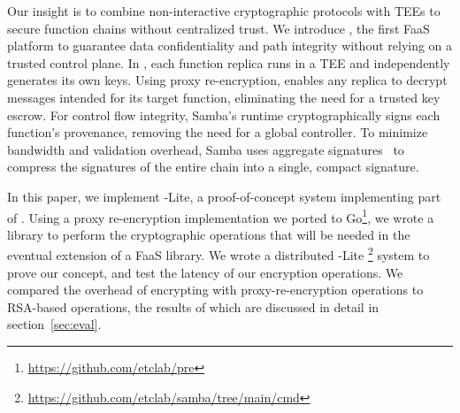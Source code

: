 %
Our insight is to combine non-interactive cryptographic protocols with
TEEs to secure function chains without centralized trust.
%
We introduce \SystemName, the first FaaS platform to guarantee data
confidentiality and path integrity without relying on a trusted control plane.
%
In \SystemName,  each function replica runs in a TEE and independently generates its own keys.
%
Using proxy re-encryption,  \SystemName enables any replica to decrypt
messages intended for its target function, eliminating the need for a trusted
key escrow.
%
For control flow integrity, Samba's runtime cryptographically signs each
function's provenance, removing the need for a global controller.
%
To minimize bandwidth and validation overhead, Samba uses aggregate
signatures~\cite{03-eurocrypt-aggregate_signatures_bilinear_maps} to compress
the signatures of the entire chain into a single, compact signature.


In this paper, we implement \SystemName-Lite, a proof-of-concept system implementing part  of \SystemName.
%
Using a proxy re-encryption implementation we ported to Go\footnote{\url{https://github.com/etclab/pre}}, we wrote a  library to perform the cryptographic operations that will be needed in the eventual \SystemName extension of a FaaS library.
%
We wrote a distributed \SystemName-Lite \footnote{\url{https://github.com/etclab/samba/tree/main/cmd}} system to prove our concept, and test the latency of our encryption operations.
%
We compared the overhead of encrypting with \SystemName proxy-re-encryption operations to RSA-based operations, the results of which are discussed in detail in section~\ref{sec:eval}.




